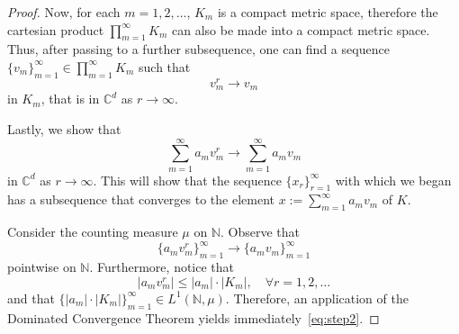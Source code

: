 \documentclass{article}
\theoremstyle{definition}
\theoremstyle{remark}
\numberwithin{equation}{section}
\newcommand{\complex}{\mathbb{C}}
\newcommand{\1}{\mathbf{1}}
\begin{document}
\begin{proof}
        Now, for each $m=1,2,\ldots$, $K_m$ is a compact metric space, therefore the cartesian product $\prod_{m=1}^{\infty}K_m$ can also be made into a compact metric space. Thus, after passing to a further subsequence, one can find a sequence $\{v_m\}_{m=1}^{\infty}\in \prod_{m=1}^{\infty}K_m$ such that
        \begin{equation*}
            v_{m}^{r}\to v_{m}
        \end{equation*}
        in $K_m$, that is in $\complex^{d}$ as $r\to\infty$.

        Lastly, we show that
        \begin{equation}
            \label{eq:step2}
            \sum_{m=1}^{\infty}a_{m}v_{m}^{r} \to \sum_{m=1}^{\infty}a_{m}v_{m}
        \end{equation}
        in $\complex^{d}$ as $r\to\infty$. This will show that the sequence $\{x_{r}\}^{\infty}_{r=1}$ with which we began has a subsequence that converges to the element $x:=\sum_{m=1}^{\infty}a_{m}v_{m}$ of $K$.

        Consider the counting measure $\mu$ on $\mathbb{N}$. Observe that
        \begin{equation*}
            \{a_{m}v_{m}^{r}\}_{m=1}^{\infty}\to\{a_{m}v_{m}\}_{m=1}^{\infty}
        \end{equation*}
        pointwise on $\mathbb{N}$. Furthermore, notice that
        \begin{equation*}
            |a_{m}v_{m}^{r}|\leq |a_{m}|\cdot|K_{m}|,\quad\forall r=1,2,\ldots
        \end{equation*}
        and that $\{|a_m|\cdot|K_{m}|\}_{m=1}^{\infty}\in L^1(\mathbb{N},\mu)$. Therefore, an application of the Dominated Convergence Theorem yields immediately~\eqref{eq:step2}.
        

\end{proof}
\end{document}
